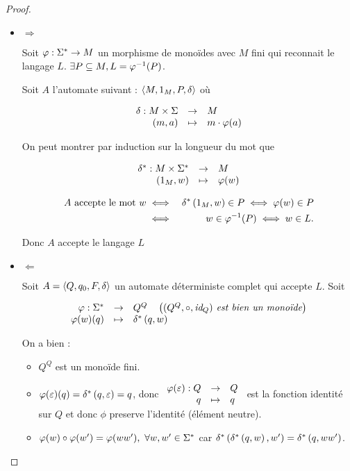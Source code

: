 \begin{proof}
	\begin{itemize}
		\item $\Rightarrow$

		      Soit $\varphi : \Sigma^{*} \to M$ un morphisme de monoïdes avec $M$ fini qui reconnait le langage $L$.
		      $\exists P \subseteq M, L = \varphi^{-1} (P)$.

		      Soit $A$ l'automate suivant : $\langle M, 1_M, P, \delta \rangle$ où

		      $$ \begin{array}{rcl}
				      \delta : M \times \Sigma & \to     & M                \\
				      (m,a)                       & \mapsto & m \cdot \varphi (a)
			      \end{array} $$

		      On peut montrer par induction sur la longueur du mot que

		      $$ \begin{array}{rcl}
				      \delta ^* : M \times \Sigma^{*} & \to     & M        \\
				      (1_M, w)                   & \mapsto & \varphi (w)
			      \end{array} $$

		      \ssi
		      \begin{eqnarray*}
			      A \text{ accepte le mot } w &\iff&  \delta^{*} \left(1_M,w\right) \in P \iff \varphi (w) \in P \\
			      &\iff&  w \in \varphi^{-1}(P) \iff w \in L.
		      \end{eqnarray*}

		      Donc $A$ accepte le langage $L$


		\item $\Leftarrow$

		      Soit $A = \langle Q, q_0, F, \delta \rangle$ un automate déterministe complet qui accepte $L$.
		      Soit

		      $$ \begin{array}{rcl}
				      \varphi : \Sigma^{*} & \to     & Q^Q        \quad\left(\textit{$(Q^Q, \circ,\text{id}_Q) $ est bien un monoïde}\right) \\
				      \varphi (w)(q)  & \mapsto & \delta^{*} \left(q,w\right)
			      \end{array} $$

		      On a bien :
		      \begin{itemize}
			      \item $Q^Q$ est un monoïde fini.
			      \item $\varphi (\varepsilon) (q) = \delta^{*} \left(q,\varepsilon\right) = q$, donc $\begin{array}{rcl}
					            \varphi (\varepsilon) : Q & \to     & Q \\
					            q                   & \mapsto & q
				            \end{array} $
			            est la fonction identité sur $Q$ et donc $\phi$ preserve l'identité (élément neutre).
			      \item $\varphi (w) \circ \varphi (w') = \varphi (ww'), \ \forall w, w' \in \Sigma^{*}$ car
			            $\delta^{*} \left(\delta^{*} \left(q,w\right),w'\right) = \delta^{*} \left(q,ww'\right)$.


\end{itemize}
\end{itemize}
\end{proof}
